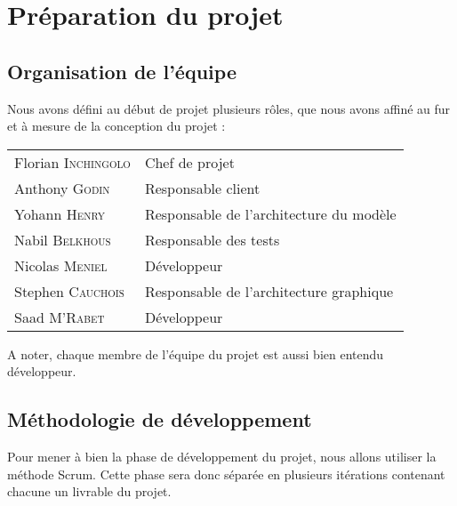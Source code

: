 \documentclass[hidelinks, 10pt,a4paper]{article}
\begin{document}
\section{Préparation du projet}
\subsection{Organisation de l'équipe}
Nous avons défini au début de projet plusieurs rôles, que nous avons affiné au
fur et à mesure de la conception du projet :
\begin{tabular}{ll}
{Florian \textsc{Inchingolo}} & {Chef de projet} \\
{Anthony \textsc{Godin}} & {Responsable client} \\
{Yohann \textsc{Henry}} & {Responsable de l'architecture du modèle} \\
{Nabil \textsc{Belkhous}} & {Responsable des tests} \\
{Nicolas \textsc{Meniel}} & {Développeur} \\
{Stephen \textsc{Cauchois}} & {Responsable de l'architecture graphique} \\
{Saad \textsc{M'Rabet}} & {Développeur} \\
\end{tabular}

A noter, chaque membre de l'équipe du projet est aussi bien entendu développeur.

\subsection{Méthodologie de développement}
Pour mener à bien la phase de développement du projet, nous allons utiliser la
méthode Scrum. Cette phase sera donc séparée en plusieurs itérations contenant
chacune un livrable du projet.
\end{document}

